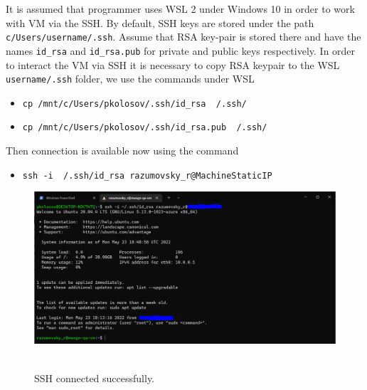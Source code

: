 It is assumed that programmer uses WSL 2 under Windows 10 in order to work with VM via the SSH\@.
By default, SSH keys are stored under the path \texttt{c/Users/username/.ssh}.
Assume that RSA key-pair is stored there and have the names \texttt{id\_rsa} and \texttt{id\_rsa.pub} for private
and public keys respectively.
In order to interact the VM via SSH it is necessary to copy RSA keypair to the WSL \texttt{username/.ssh} folder,
we use the commands under WSL
\begin{itemize}
    \item \texttt{cp /mnt/c/Users/pkolosov/.ssh/id\_rsa ~/.ssh/}
    \item \texttt{cp /mnt/c/Users/pkolosov/.ssh/id\_rsa.pub ~/.ssh/}
\end{itemize}
Then connection is available now using the command
\begin{itemize}
    \item \texttt{ssh -i ~/.ssh/id\_rsa razumovsky\_r@MachineStaticIP}
\end{itemize}
\begin{figure}[H]
    \centering
    \includegraphics[width=1\textwidth]{img/01_ssh_connected}
    ~\caption{SSH connected successfully.}\label{fig:figure}
\end{figure}
